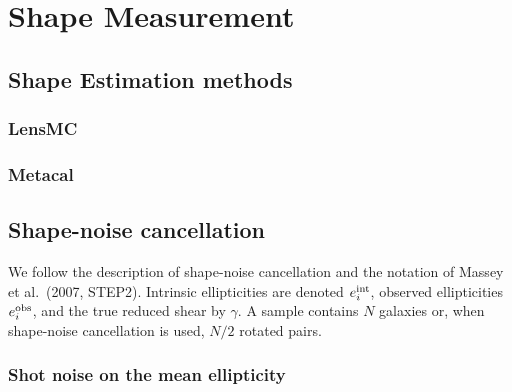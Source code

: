 \documentclass[11pt]{EuclidVIS}
\numberwithin{table}{section}
\numberwithin{figure}{section}
\begin{document}
\section{Shape Measurement}
\label{sec:shape_measurement}

\subsection{Shape Estimation methods}
\subsubsection{LensMC}

\subsubsection{Metacal}

\subsection{Shape-noise cancellation}
We follow the description of shape-noise cancellation and the notation of Massey et al.\ (2007, STEP2).  
Intrinsic ellipticities are denoted $e_i^{\rm int}$, observed ellipticities $e_i^{\rm obs}$, 
and the true reduced shear by $\gamma$. A sample contains $N$ galaxies or, when shape-noise
cancellation is used, $N/2$ rotated pairs.

\subsubsection{Shot noise on the mean ellipticity}
\end{document}
